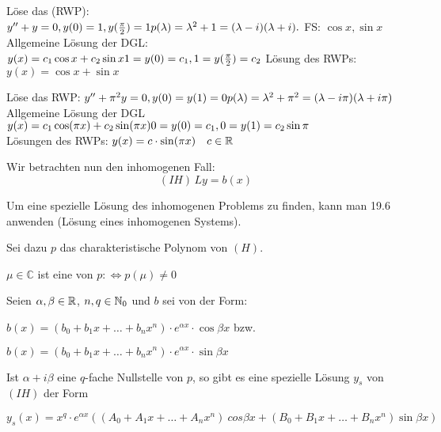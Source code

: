 \documentclass[a4paper,twoside,DIV15,BCOR12mm]{scrbook}
\begin{document}
\begin{beispiele}
\item Löse das  (RWP): \\
$y'' + y = 0, y(0) = 1, y(\frac{\pi}{2}) = 1 \\
p(\lambda) = \lambda ^2 + 1 = (\lambda - i)(\lambda + i).$ FS: $\cos x, \sin x$ \\
Allgemeine Lösung der DGL: $y(x) = c_1\cos x + c_2\sin x \\
1 = y(0) = c_1, 1 = y(\frac{\pi}{2}) = c_2$ Lösung des RWPs: $y(x) = \cos x + \sin x$

\item Löse das RWP:
$y'' + \pi ^2y = 0, y(0) = y(1) = 0 \\
p(\lambda) = \lambda ^2 + \pi ^2 = (\lambda - i\pi)(\lambda + i\pi)$ \\
Allgemeine Lösung der DGL $y(x) = c_1\cos (\pi x) + c_2\sin (\pi x) \\
0 = y(0) = c_1, 0 = y(1) = c_2 \sin \pi$ \\
Lösungen des RWPs: $y(x) = c\cdot\sin (\pi x) \quad c \in \mathbb{R}$


\end{beispiele}


Wir betrachten nun den inhomogenen Fall:
\begin{displaymath}
(IH) \, Ly = b(x)
\end{displaymath}

Um eine spezielle Lösung des inhomogenen Problems zu finden, kann man 19.6 anwenden (Lösung eines inhomogenen Systems).

Sei dazu $p$ das charakteristische Polynom von $(H)$. 
\begin{definition}
$\mu \in \mathbb{C}$ ist eine  von $p: \Leftrightarrow p(\mu) \ne 0$
\end{definition}


\begin{satz}
Seien $\alpha, \beta \in \mathbb{R}$, $n, q \in \mathbb{N}_0$ und $b$ sei von der Form:

$b(x)=(b_0+b_1x+ \dots +b_n x^n) \cdot e^{\alpha x} \cdot \cos \beta x$ bzw.

$b(x)=(b_0+b_1x+ \dots +b_n x^n) \cdot e^{\alpha x} \cdot \sin \beta x$

Ist $\alpha + i \beta$ eine $q$-fache Nullstelle von $p$, so gibt es eine spezielle Lösung $y_s$ von $(IH)$ der Form

$y_s(x)= x^q \cdot e^{\alpha x}((A_0+A_1 x+ \dots + A_n x^n)\ cos \beta x + (B_0 + B_1 x + \dots + B_n x^n) \sin \beta x)$
\end{satz}
\end{document}
